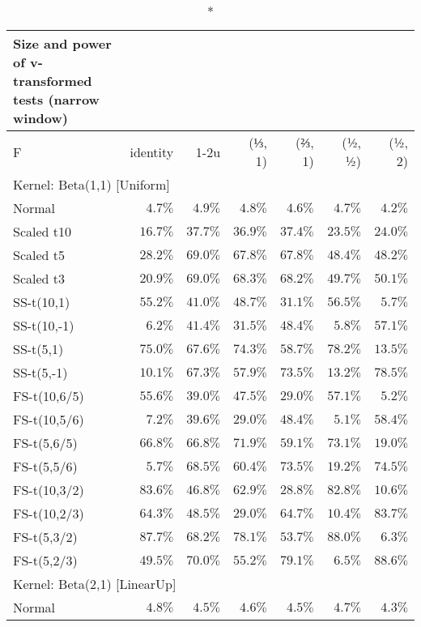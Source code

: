 \setlength{\LTpost}{0mm}
\begin{longtable}{lrrrrrr}
\caption*{
{\large Size and power of v-transformed tests (narrow window)}
} \\ 
\toprule
F & identity & \textbar{}1-2u\textbar{} & (⅓, 1) & (⅔, 1) & (½, ½) & (½, 2) \\ 
\midrule
\multicolumn{7}{l}{Kernel: Beta(1,1) [Uniform]} \\ 
\midrule
Normal & $4.7\%$ & $4.9\%$ & $4.8\%$ & $4.6\%$ & $4.7\%$ & $4.2\%$ \\ 
Scaled t10 & $16.7\%$ & $37.7\%$ & $36.9\%$ & $37.4\%$ & $23.5\%$ & $24.0\%$ \\ 
Scaled t5 & $28.2\%$ & $69.0\%$ & $67.8\%$ & $67.8\%$ & $48.4\%$ & $48.2\%$ \\ 
Scaled t3 & $20.9\%$ & $69.0\%$ & $68.3\%$ & $68.2\%$ & $49.7\%$ & $50.1\%$ \\ 
SS-t(10,1) & $55.2\%$ & $41.0\%$ & $48.7\%$ & $31.1\%$ & $56.5\%$ & $5.7\%$ \\ 
SS-t(10,-1) & $6.2\%$ & $41.4\%$ & $31.5\%$ & $48.4\%$ & $5.8\%$ & $57.1\%$ \\ 
SS-t(5,1) & $75.0\%$ & $67.6\%$ & $74.3\%$ & $58.7\%$ & $78.2\%$ & $13.5\%$ \\ 
SS-t(5,-1) & $10.1\%$ & $67.3\%$ & $57.9\%$ & $73.5\%$ & $13.2\%$ & $78.5\%$ \\ 
FS-t(10,6/5) & $55.6\%$ & $39.0\%$ & $47.5\%$ & $29.0\%$ & $57.1\%$ & $5.2\%$ \\ 
FS-t(10,5/6) & $7.2\%$ & $39.6\%$ & $29.0\%$ & $48.4\%$ & $5.1\%$ & $58.4\%$ \\ 
FS-t(5,6/5) & $66.8\%$ & $66.8\%$ & $71.9\%$ & $59.1\%$ & $73.1\%$ & $19.0\%$ \\ 
FS-t(5,5/6) & $5.7\%$ & $68.5\%$ & $60.4\%$ & $73.5\%$ & $19.2\%$ & $74.5\%$ \\ 
FS-t(10,3/2) & $83.6\%$ & $46.8\%$ & $62.9\%$ & $28.8\%$ & $82.8\%$ & $10.6\%$ \\ 
FS-t(10,2/3) & $64.3\%$ & $48.5\%$ & $29.0\%$ & $64.7\%$ & $10.4\%$ & $83.7\%$ \\ 
FS-t(5,3/2) & $87.7\%$ & $68.2\%$ & $78.1\%$ & $53.7\%$ & $88.0\%$ & $6.3\%$ \\ 
FS-t(5,2/3) & $49.5\%$ & $70.0\%$ & $55.2\%$ & $79.1\%$ & $6.5\%$ & $88.6\%$ \\ 
\midrule
\multicolumn{7}{l}{Kernel: Beta(2,1) [LinearUp]} \\ 
\midrule
Normal & $4.8\%$ & $4.5\%$ & $4.6\%$ & $4.5\%$ & $4.7\%$ & $4.3\%$ \\ 

\end{longtable}
